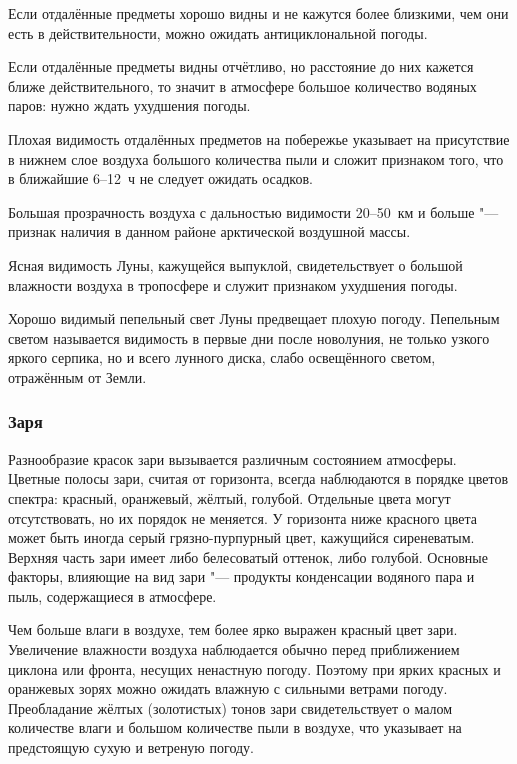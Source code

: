  Если отдалённые предметы хорошо видны и не кажутся более
близкими, чем они есть в действительности, можно ожидать
антициклональной погоды.

 Если отдалённые предметы видны отчётливо, но расстояние до них
кажется ближе действительного, то значит в атмосфере большое
количество водяных паров: нужно ждать ухудшения погоды.

 Плохая видимость отдалённых предметов на побережье указывает
на присутствие в нижнем слое воздуха большого количества пыли и сложит
признаком того, что в ближайшие 6--12~ч не следует ожидать осадков.

 Большая прозрачность воздуха с дальностью видимости 20--50~км
и больше "--- признак наличия в данном районе арктической воздушной
массы.

 Ясная видимость Луны, кажущейся выпуклой, свидетельствует о
большой влажности воздуха в тропосфере и служит признаком ухудшения
погоды.

 Хорошо видимый пепельный свет Луны предвещает плохую
погоду. Пепельным светом называется видимость в первые дни после
новолуния, не только узкого яркого серпика, но и всего лунного диска,
слабо освещённого светом, отражённым от Земли.

\subsubsection{Заря}

Разнообразие красок зари вызывается различным состоянием
атмосферы. Цветные полосы зари, считая от горизонта, всегда
наблюдаются в порядке цветов спектра: красный, оранжевый, жёлтый,
голубой. Отдельные цвета могут отсутствовать, но их порядок не
меняется. У горизонта ниже красного цвета может быть иногда серый
грязно-пурпурный цвет, кажущийся сиреневатым. Верхняя часть зари имеет
либо белесоватый оттенок, либо голубой. Основные факторы, влияющие на
вид зари "--- продукты конденсации водяного пара и пыль, содержащиеся в
атмосфере.

Чем больше влаги в воздухе, тем более ярко выражен красный цвет
зари. Увеличение влажности воздуха наблюдается обычно перед
приближением циклона или фронта, несущих ненастную погоду. Поэтому при
ярких красных и оранжевых зорях можно ожидать влажную с сильными
ветрами погоду. Преобладание жёлтых (золотистых) тонов зари
свидетельствует о малом количестве влаги и большом количестве пыли в
воздухе, что указывает на предстоящую сухую и ветреную погоду.

